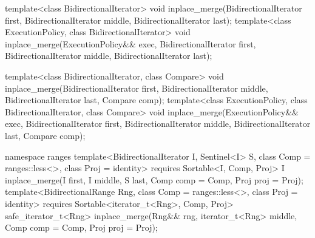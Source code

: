 %
\begin{itemdecl}
template<class BidirectionalIterator>
  void inplace_merge(BidirectionalIterator first,
                     BidirectionalIterator middle,
                     BidirectionalIterator last);
template<class ExecutionPolicy, class BidirectionalIterator>
  void inplace_merge(ExecutionPolicy&& exec,
                     BidirectionalIterator first,
                     BidirectionalIterator middle,
                     BidirectionalIterator last);

template<class BidirectionalIterator, class Compare>
  void inplace_merge(BidirectionalIterator first,
                     BidirectionalIterator middle,
                     BidirectionalIterator last, Compare comp);
template<class ExecutionPolicy, class BidirectionalIterator, class Compare>
  void inplace_merge(ExecutionPolicy&& exec,
                     BidirectionalIterator first,
                     BidirectionalIterator middle,
                     BidirectionalIterator last, Compare comp);
\end{itemdecl}
\begin{addedblock}
\begin{itemdecl}
namespace ranges {
  template<BidirectionalIterator I, Sentinel<I> S, class Comp = ranges::less<>,
      class Proj = identity>
    requires Sortable<I, Comp, Proj>
    I inplace_merge(I first, I middle, S last, Comp comp = Comp{}, Proj proj = Proj{});
  template<BidirectionalRange Rng, class Comp = ranges::less<>, class Proj = identity>
    requires Sortable<iterator_t<Rng>, Comp, Proj>
    safe_iterator_t<Rng>
      inplace_merge(Rng&& rng, iterator_t<Rng> middle, Comp comp = Comp{},
                    Proj proj = Proj{});
}
\end{itemdecl}
\end{addedblock}

